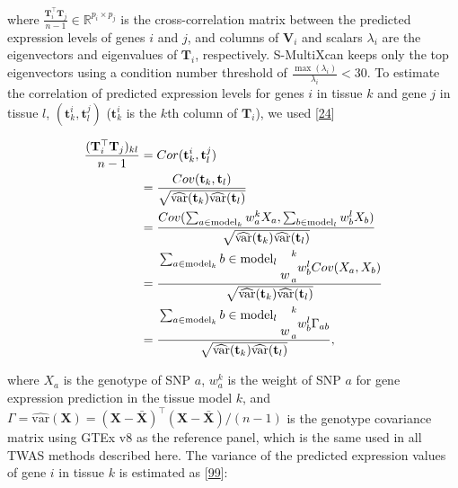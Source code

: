 \documentclass[
        11pt,
]{article}
\begin{document}
where \(\frac{\mathbf{T}_{i}^{\top} \mathbf{T}_{j}}{n-1} \in \mathbb{R}^{p_i \times p_j}\) is the cross-correlation matrix between the predicted expression levels of genes \(i\) and \(j\),
and columns of \(\mathbf{V}_{i}\) and scalars \(\lambda_i\) are the eigenvectors and eigenvalues of \(\mathbf{T}_{i}\), respectively.
S-MultiXcan keeps only the top eigenvectors using a condition number threshold of \(\frac{\max(\lambda_i)}{\lambda_i} < 30\).
To estimate the correlation of predicted expression levels for genes \(i\) in tissue \(k\) and gene \(j\) in tissue \(l\), \((\mathbf{t}_k^i, \mathbf{t}_l^j)\) (\(\mathbf{t}_k^i\) is the \(k\)th column of \(\mathbf{T}_{i}\)), we used {[}\protect\hyperlink{ref-1FFzCXo1s}{24}{]}

\begin{equation}
\begin{split}
\frac{(\mathbf{T}_{i}^{\top} \mathbf{T}_{j})_{kl}}{n-1} & = Cor(\mathbf{t}_k^i, \mathbf{t}_l^j) \\
 & = \frac{ Cov(\mathbf{t}_k, \mathbf{t}_l) } { \sqrt{\widehat{\mathrm{var}}(\mathbf{t}_k) \widehat{\mathrm{var}}(\mathbf{t}_l)} } \\
 & = \frac{ Cov(\sum_{a \in \mathrm{model}_k} w_a^k X_a, \sum_{b \in \mathrm{model}_l} w_b^l X_b) }  {\sqrt{\widehat{\mathrm{var}}(\mathbf{t}_k) \widehat{\mathrm{var}}(\mathbf{t}_l)} } \\
 & = \frac{ \splitfrac{\sum_{a \in \mathrm{model}_k}{b \in \mathrm{model}_l}} w_a^k w_b^l Cov(X_a, X_b)} {\sqrt{\widehat{\mathrm{var}}(\mathbf{t}_k) \widehat{\mathrm{var}}(\mathbf{t}_l)} } \\
        & = \frac{ \splitfrac{\sum_{a \in \mathrm{model}_k}{b \in \mathrm{model}_l}} w_a^k w_b^l \Gamma_{ab}} {\sqrt{\widehat{\mathrm{var}}(\mathbf{t}_k) \widehat{\mathrm{var}}(\mathbf{t}_l)} },
\end{split}
\label{eq:reg:corrgenes}\end{equation}

where \(X_a\) is the genotype of SNP \(a\),
\(w_a^k\) is the weight of SNP \(a\) for gene expression prediction in the tissue model \(k\),
and \(\Gamma = \widehat{\mathrm{var}}(\mathbf{X}) = (\mathbf{X} - \mathbf{\bar{X}})^{\top} (\mathbf{X} - \mathbf{\bar{X}}) / (n-1)\) is the genotype covariance matrix using GTEx v8 as the reference panel, which is the same used in all TWAS methods described here.
The variance of the predicted expression values of gene \(i\) in tissue \(k\) is estimated as {[}\protect\hyperlink{ref-vLyTudUB}{99}{]}:
\end{document}
